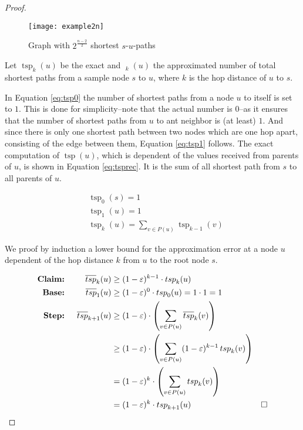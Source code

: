 \documentclass[11pt]{article}
\newcommand{\tsp}{\mathop{tsp}}
\newcommand{\tspapp}{\mathop{\overline{tsp}}}
\begin{document}
\begin{proof}
\begin{figure}[h]
\begin{center}
\texttt{[image: example2n]}
\caption{Graph with $2^{\frac{n-2}{2}}$ shortest $s$-$u$-paths}\label{abb:example2n}
\end{center}
\end{figure}

Let $\tsp_k(u)$ be the exact and $\tspapp_k(u)$ the approximated number of total shortest paths from a sample node $s$ to $u$, where $k$ is the hop distance of $u$ to $s$.

In Equation \eqref{eq:tsp0} the number of shortest paths from a node $u$ to itself is set to $1$. This is done for simplicity--note that the actual number is $0$--as it ensures that the number of shortest paths from $u$ to ant neighbor is (at least) $1$. And since there is only one shortest path between two nodes which are one hop apart, consisting of the edge between them, Equation \eqref{eq:tsp1} follows.
The exact computation of $\tsp(u)$, which is dependent of the values received from parents of $u$, is shown in Equation \eqref{eq:tsprec}. It is the sum of all shortest path from $s$ to all parents of $u$.

\begin{align}
&\tsp\nolimits_0(s)=1 \label{eq:tsp0}\\
&\tsp\nolimits_1(u)=1 \label{eq:tsp1}\\
&\tsp\nolimits_k(u)=\sum_{v\in P(u)}\tsp\nolimits_{k-1}(v)
\label{eq:tsprec}
\end{align}

We proof by induction a lower bound for the approximation error at a node $u$ dependent of the hop distance $k$ from $u$ to the root node $s$.

\begin{align}
\textbf{Claim: }&& 
\tspapp\nolimits_k(u)&\geq(1-\varepsilon)^{k-1}\cdot\tsp\nolimits_k(u)
\label{eq:tspclaim}  \allowdisplaybreaks[4] \\
\textbf{Base: }&& 
\tspapp\nolimits_1(u)&\geq(1-\varepsilon)^0\cdot\tsp\nolimits_0(u)=1\cdot 1=1
\label{eq:tspbase}  \allowdisplaybreaks[4] \\
\textbf{Step: }&& 
\tspapp\nolimits_{k+1}(u) &\geq (1-\varepsilon)\cdot\left(\sum_{v\in P(u)}\tspapp\nolimits_{k}(v)\right)\nonumber\\
&& &\geq (1-\varepsilon)\cdot\left(\sum_{v\in P(u)}(1-\varepsilon)^{k-1}\tsp\nolimits_{k}(v)\right)\nonumber\\
&& &= (1-\varepsilon)^{k}\cdot\left(\sum_{v\in P(u)}\tsp\nolimits_{k}(v)\right)\nonumber\\
&& &= (1-\varepsilon)^{k}\cdot\tsp\nolimits_{k+1}(u) & \square
\label{eq:tspstep}
\end{align}



\end{proof}
\end{document}
